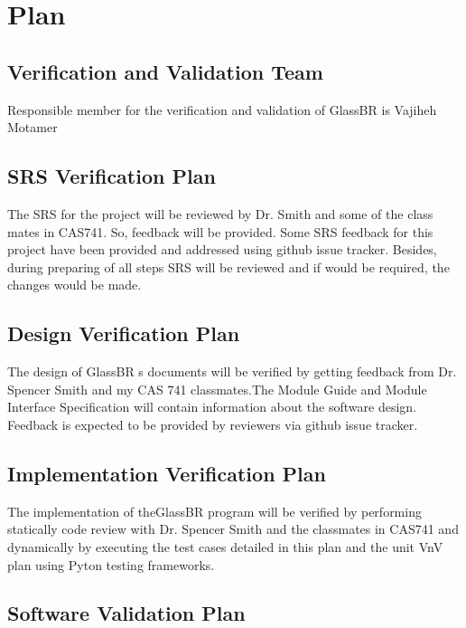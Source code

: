 \documentclass[12pt, titlepage]{article}
\newcommand{\progname}{GlassBR}
\begin{document}
\section{Plan} \label{sec_Plan}
	
\subsection{Verification and Validation Team}

\noindent Responsible member for the verification and validation 
of \progname{} is Vajiheh Motamer

\subsection{SRS Verification Plan}

\noindent The SRS for the project will be reviewed by Dr. Smith and some of the class mates in CAS741.
So, feedback will be provided. Some SRS feedback for this project have been
provided and addressed using github issue tracker. Besides, during preparing of all steps SRS will be reviewed and if would be required, the changes would be made.

\subsection{Design Verification Plan}

\noindent The design of \progname{} s  documents will be verified by getting feedback from Dr.
Spencer Smith and my CAS 741 classmates.The Module Guide and Module Interface Specification will
contain information about the software design. Feedback is expected to be
provided by reviewers via github issue tracker.

\subsection{Implementation Verification Plan} \label{sec_ImpPlan}

The implementation of the\progname{} program will be verified  by performing statically code review with Dr. Spencer Smith and the classmates in CAS741 and
dynamically by executing the test cases detailed in this plan and the unit
VnV plan using Pyton testing frameworks.


\subsection{Software Validation Plan}
\end{document}
